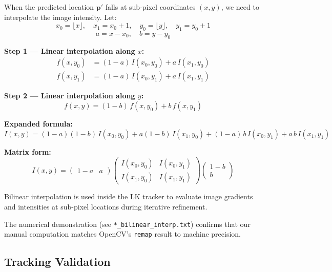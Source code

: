 \documentclass[12pt, a4paper]{article}
\begin{document}
When the predicted location $\mathbf{p}'$ falls at sub-pixel coordinates $(x, y)$, we need to interpolate the image intensity.  Let:
\[
  x_0 = \lfloor x \rfloor, \quad x_1 = x_0 + 1, \quad y_0 = \lfloor y \rfloor, \quad y_1 = y_0 + 1
\]
\[
  a = x - x_0, \quad b = y - y_0
\]

\textbf{Step 1 --- Linear interpolation along $x$:}
\begin{align}
  f(x, y_0) &= (1 - a)\, I(x_0, y_0) + a\, I(x_1, y_0) \\
  f(x, y_1) &= (1 - a)\, I(x_0, y_1) + a\, I(x_1, y_1)
\end{align}

\textbf{Step 2 --- Linear interpolation along $y$:}
\[
  f(x, y) = (1 - b)\, f(x, y_0) + b\, f(x, y_1)
\]

\textbf{Expanded formula:}
\begin{equation}
  \boxed{
    I(x, y) = (1-a)(1-b)\,I(x_0,y_0) + a(1-b)\,I(x_1,y_0)
             + (1-a)\,b\,I(x_0,y_1) + a\,b\,I(x_1,y_1)
  }
  \label{eq:bilinear}
\end{equation}

\textbf{Matrix form:}
\[
  I(x,y) = \begin{pmatrix} 1-a & a \end{pmatrix}
  \begin{pmatrix} I(x_0,y_0) & I(x_0,y_1) \\ I(x_1,y_0) & I(x_1,y_1) \end{pmatrix}
  \begin{pmatrix} 1-b \\ b \end{pmatrix}
\]

Bilinear interpolation is used inside the LK tracker to evaluate image gradients and intensities at sub-pixel locations during iterative refinement.

The numerical demonstration (see \texttt{*\_bilinear\_interp.txt}) confirms that our manual computation matches OpenCV's \texttt{remap} result to machine precision.

\subsection{Tracking Validation}
\end{document}
